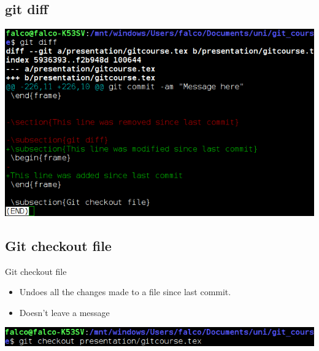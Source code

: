 \documentclass[10pt,a4paper]{beamer}
\begin{document}
\subsection{git diff}
\begin{frame}
\includegraphics[width=\linewidth]{gitdiff.png}
\end{frame}

\subsection{Git checkout file}
\begin{frame}{Git checkout file}
\begin{itemize}
\item Undoes all the changes made to a file since last commit.
\item Doesn't leave a message
\end{itemize}
\includegraphics[width=\linewidth]{gitcheckoutfile.png}
\end{frame}
\end{document}
